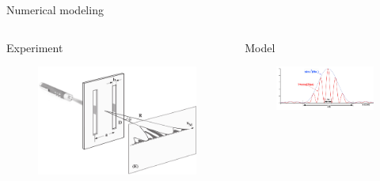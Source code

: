 \documentclass[9pt]{beamer}
\begin{document}
\begin{frame}{Numerical modeling}
\begin{columns}[c]
	\begin{column}{0.35\textwidth}
		\begin{block}{Experiment}
			\begin{figure}
				\includegraphics[width=\linewidth]{images/DoubleFente}
			\end{figure}
		\end{block}
		
	\end{column}
	
	\begin{column}{0.55\textwidth}
		\begin{block}{Model}
			\begin{figure}
				
				\includegraphics[width=\linewidth]{images/im2}
			\end{figure}
		\end{block}
			
	\end{column}
\end{columns}
	

\end{frame}
\end{document}
